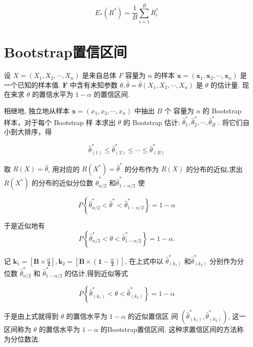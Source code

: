 $$ E_{*}\left(R^{*}\right)=\frac{1}{B} \sum_{i=1}^{B} R_{i}^{*} $$

\section{Bootstrap置信区间}

设 $ X=\left(X_{1}, X_{2}, \cdots, X_{n}\right) $ 是来自总体 $ F $ 容量为 $ n $ 的样本 $ \boldsymbol{x}=\left(\boldsymbol{x}_{1}, \boldsymbol{x}_{2}, \cdots, \boldsymbol{x}_{n}\right) $ 是一个已知的样本值.  $ \boldsymbol{F} $ 中含有未知参数 $ \theta, \hat{\theta}=\hat{\theta}\left(X_{1}, X_{2}, \cdots, X_{n}\right) $ 是 $ \theta $ 的估计量. 现在来求 $ \theta $ 的置信水平为 $ 1-\alpha $ 的置信区间. 

相继地, 独立地从样本 $ \boldsymbol{x}=\left(x_{1}, x_{2}, \cdots, x_{n}\right) $ 中抽出 $ B $ 个 容量为 $ n $ 的 Bootstrap 样本，对于每个 Bootstrap 样 本求出 $ \theta $ 的 Bootstrap 估计: $ \hat{\theta}_{1}^{*}, \hat{\theta}_{2}^{*}, \cdots, \hat{\theta}_{B}^{*} $ .  将它们自 小到大排序，得

$$ \hat{\theta}_{(1)}^{*} \leq \hat{\theta}_{(2)}^{*} \leq \cdots \leq \hat{\theta}_{(B)}^{*} $$

取 $ R(X)=\hat{\theta} $, 用对应的 $ R\left(X^{*}\right)=\hat{\theta}^{*} $ 的分布作为 $ R(X) $ 的分布的近似,求出 $ R\left(X^{*}\right) $ 的分布的近似分位数 $ \hat{\theta}_{\alpha / 2}^{*} $ 和$ \hat{\theta}_{1-\alpha / 2}^{*} $ 使

$$ P\left\{\hat{\theta}_{\alpha / 2}^{*}<\hat{\theta}^{*}<\hat{\theta}_{1-\alpha / 2}^{*}\right\}=1-\alpha $$

于是近似地有
$$
P\left\{\hat{\theta}_{\alpha / 2}^{*}<\theta<\hat{\theta}_{1-\alpha / 2}^{*}\right\}=1-\alpha .
$$

记 $ \boldsymbol{k}_{1}=\left[\boldsymbol{B} \times \frac{\alpha}{\mathbf{2}}\right], \boldsymbol{k}_{2}=\left[\boldsymbol{B} \times\left(\mathbf{1}-\frac{\alpha}{\mathbf{2}}\right)\right] $, 在上式中以 $ \hat{\theta}_{\left(k_{1}\right)}^{*} $ 和$ \hat{\theta}_{\left(k_{2}\right)}^{*} $ 分别作为分位数 $ \hat{\theta}_{\alpha / 2}^{*} $ 和 $ \hat{\theta}_{1-\alpha / 2}^{*} $ 的估计,得到近似等式

$$ P\left\{\hat{\theta}_{\left(k_{1}\right)}^{*}<\theta<\hat{\theta}_{\left(k_{2}\right)}^{*}\right\}=1-\alpha $$

于是由上式就得到 $ \theta $ 的置信水平为 $ 1-\alpha $ 的近似置信区 间 $ \left(\hat{\theta}_{\left(k_{1}\right)}^{*}, \hat{\theta}_{\left(k_{2}\right)}^{*}\right) $, 这一区间称为 $ \theta $ 的置信水平为 $ 1-\alpha $ 的Bootstrap置信区间. 这种求置信区间的方法称为分位数法. 

